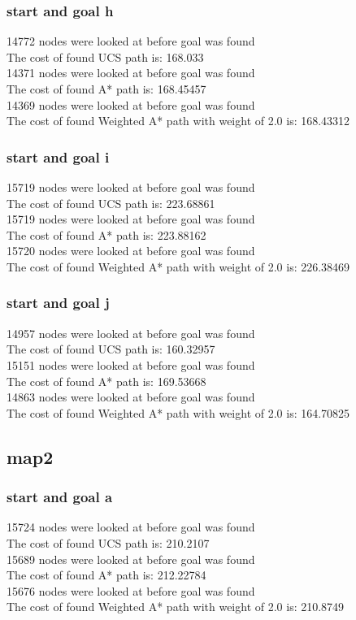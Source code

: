 \documentclass[11pt]{article} %
\begin{document}
\subsubsection{start and goal h}
14772 nodes were looked at before goal was found\\
The cost of found UCS path is: 168.033\\
14371 nodes were looked at before goal was found\\
The cost of found A* path is: 168.45457\\
14369 nodes were looked at before goal was found\\
The cost of found Weighted A* path with weight of 2.0 is: 168.43312\\
\subsubsection{start and goal i}
15719 nodes were looked at before goal was found\\
The cost of found UCS path is: 223.68861\\
15719 nodes were looked at before goal was found\\
The cost of found A* path is: 223.88162\\
15720 nodes were looked at before goal was found\\
The cost of found Weighted A* path with weight of 2.0 is: 226.38469\\
\subsubsection{start and goal j}
14957 nodes were looked at before goal was found\\
The cost of found UCS path is: 160.32957\\
15151 nodes were looked at before goal was found\\
The cost of found A* path is: 169.53668\\
14863 nodes were looked at before goal was found\\
The cost of found Weighted A* path with weight of 2.0 is: 164.70825\\

\subsection{map2}
\subsubsection{start and goal a}
15724 nodes were looked at before goal was found\\
The cost of found UCS path is: 210.2107\\
15689 nodes were looked at before goal was found\\
The cost of found A* path is: 212.22784\\
15676 nodes were looked at before goal was found\\
The cost of found Weighted A* path with weight of 2.0 is: 210.8749\\
\end{document}
